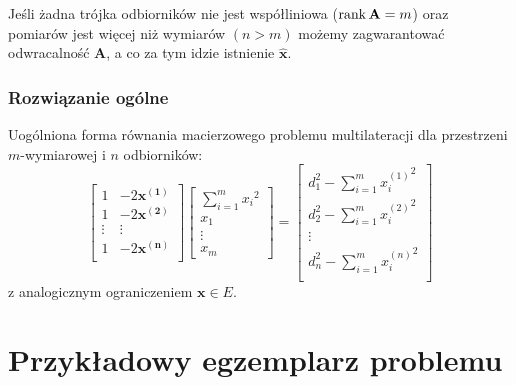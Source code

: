 Jeśli żadna trójka odbiorników nie jest współliniowa ($\operatorname{rank}\mathbf{A} = m$) oraz pomiarów jest więcej niż wymiarów $(n > m)$ możemy zagwarantować odwracalność $\mathbf{A}$, a co za tym idzie istnienie $\hat{\mathbf{x}}$.

\subsubsection{Rozwiązanie ogólne}

Uogólniona forma równania macierzowego problemu multilateracji dla przestrzeni $m$-wymiarowej i $n$ odbiorników:
\begin{equation}
    \left[
        \begin{matrix}
            1 & -2\mathbf{x^{(1)}}\\
            1 & -2\mathbf{x^{(2)}}\\
            \vdots & \vdots\\
            1 & -2\mathbf{x^{(n)}}\\
        \end{matrix}
    \right]
    \left[
        \begin{matrix}
            \sum_{i=1}^{m}{x_i}^2\\
            x_1\\
            \vdots\\
            x_m
        \end{matrix}
    \right]
    =
    \left[
        \begin{matrix}
            d_1^2 - \sum_{i=1}^{m}{x_i^{(1)}}^2\\
            d_2^2 - \sum_{i=1}^{m}{x_i^{(2)}}^2\\
            \vdots\\
            d_n^2 - \sum_{i=1}^{m}{x_i^{(n)}}^2\\
        \end{matrix}
    \right]
\end{equation}
z analogicznym ograniczeniem $\mathbf{x} \in E$.

\section{Przykładowy egzemplarz problemu}

